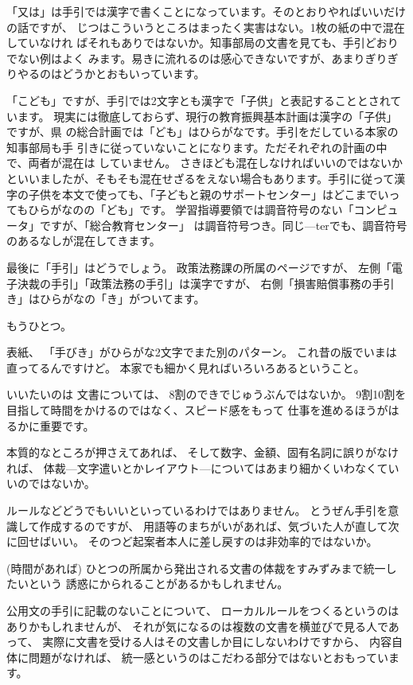 \documentclass[uplatex,jis2004,dvipdfmx,12pt]{jsarticle}
\begin{document}
「又は」は手引では漢字で書くことになっています。そのとおりやればいいだけの話ですが、
じつはこういうところはまったく実害はない。1枚の紙の中で混在していなけれ
ばそれもありではないか。知事部局の文書を見ても、手引どおりでない例はよく
みます。易きに流れるのは感心できないですが、あまりぎりぎりやるのはどうかとおもいっています。


「こども」ですが、手引では2文字とも漢字で「子供」と表記することとされています。
現実には徹底しておらず、現行の教育振興基本計画は漢字の「子供」ですが、県
の総合計画では「ども」はひらがなです。手引をだしている本家の知事部局も手
引きに従っていないことになります。ただそれぞれの計画の中で、両者が混在は
していません。
さきほども混在しなければいいのではないかといいましたが、そもそも混在せざるをえない場合もあります。手引に従って漢字の子供を本文で使っても、「子どもと親のサポートセンター」はどこまでいってもひらがなのの「ども」です。
学習指導要領では調音符号のない「コンピュータ」ですが、「総合教育センター」
は調音符号つき。同じ---terでも、調音符号のあるなしが混在してきます。

最後に「手引」はどうでしょう。
政策法務課の所属のページですが、
左側「電子決裁の手引」「政策法務の手引」は漢字ですが、
右側「損害賠償事務の手引き」はひらがなの「き」がついてます。


もうひとつ。

表紙、
「手びき」がひらがな2文字でまた別のパターン。
これ昔の版でいまは直ってるんですけど。
本家でも細かく見ればいろいろあるということ。

いいたいのは
文書については、
8割のできでじゅうぶんではないか。
9割10割を目指して時間をかけるのではなく、スピード感をもって
仕事を進めるほうがはるかに重要です。

本質的なところが押さえてあれば、
そして数字、金額、固有名詞に誤りがなければ、
体裁---文字遣いとかレイアウト---についてはあまり細かくいわなくていいのではないか。


ルールなどどうでもいいといっているわけではありません。
とうぜん手引を意識して作成するのですが、
用語等のまちがいがあれば、気づいた人が直して次に回せばいい。
そのつど起案者本人に差し戻すのは非効率的ではないか。

(時間があれば)
ひとつの所属から発出される文書の体裁をすみずみまで統一したいという
誘惑にかられることがあるかもしれません。

公用文の手引に記載のないことについて、
ローカルルールをつくるというのはありかもしれませんが、
それが気になるのは複数の文書を横並びで見る人であって、
実際に文書を受ける人はその文書しか目にしないわけですから、
内容自体に問題がなければ、
統一感というのはこだわる部分ではないとおもっています。
\end{document}
